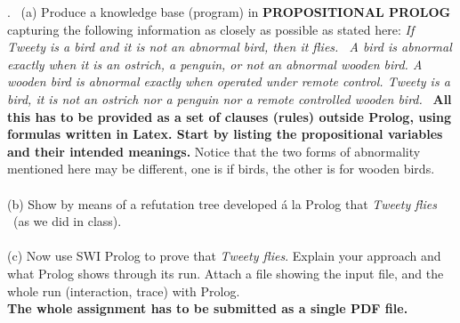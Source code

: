 \documentclass[fullapage,12pt]{article}
\begin{document}
. \ (a) Produce a knowledge base (program) in {\bf PROPOSITIONAL PROLOG} capturing the following information as closely as possible as stated here: {\em If Tweety is a bird and it is not an abnormal bird, then it flies. \
A bird is abnormal exactly when it is an ostrich, a penguin, or not an abnormal wooden bird. A wooden bird is abnormal exactly when operated under remote control. Tweety is a bird, it is  not
an ostrich nor a penguin nor a remote controlled wooden bird.}  \ {\bf All this has to be provided as a set of clauses (rules) outside Prolog, using formulas written in Latex. Start by listing the propositional variables and their intended meanings.} Notice that the two forms of abnormality mentioned here may be different, one is if birds, the other is for wooden birds.\\
\\
(b) Show by means of a refutation tree developed \'a la Prolog that  {\em Tweety flies} \ (as we did in class).\\
\\
(c) Now use SWI Prolog to prove that {\em Tweety flies}. Explain your approach and what Prolog shows through its run. Attach a file showing the input file, and the whole run (interaction, trace) with Prolog.  \\




{\bf The whole assignment has to be submitted as a single PDF file.}

\end{document}
